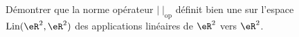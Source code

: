 
\begin{exercice}\label{exoSerieDeux0001}

	Démontrer que la norme opérateur $|\;|_{\mbox{op}}$ définit bien une  sur l'espace $\mbox{Lin}(\eR^2,\eR^2)$ des applications linéaires de $\eR^2$ vers $\eR^2$.

\end{exercice}
